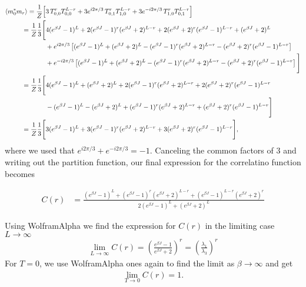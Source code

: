 \documentclass[reprint,english,notitlepage,aps,nobalancelastpage,nofootinbib]{revtex4-1}
\newcommand{\closed}[1]{\left(#1\right)}
\newcommand{\bracket}[1]{\left[#1\right]}
\newcommand{\ebj}{e^{\beta J}}
\renewcommand{\l}{\lambda}
\begin{document}
\begin{align*}
	\expval{m_0^* m_r} = \frac{1}{Z} \Big[ &3\, T_{0,0}^r T_{0,0}^{L-r} + 3e^{i2\pi/3}\, T_{0,1}^r T_{1,0}^{L-r} + 3e^{-i2\pi/3}\, T_{1,0}^r T_{0,1}^{L-r} \Big] \\ 
	= \frac{1}{Z} \frac{1}{3} \Bigg[ &4(\ebj-1)^L + 2(\ebj-1)^r (\ebj+2)^{L-r} + 2 (\ebj+2)^r (\ebj-1)^{L-r} + (\ebj+2)^L \\
	& + e^{i2\pi/3}\bracket{ (\ebj-1)^L + (\ebj+2)^L - (\ebj-1)^r (\ebj+2)^{L-r} - (\ebj+2)^r (\ebj-1)^{L-r} } \\
	& + e^{-i2\pi/3} \bracket{(\ebj-1)^L + (\ebj+2)^L - (\ebj-1)^r (\ebj+2)^{L-r} - (\ebj+2)^r (\ebj-1)^{L-r}} \Bigg] \\ 
	= \frac{1}{Z}\frac{1}{3} \Bigg[ & 4(\ebj-1)^L + (\ebj+2)^L + 2(\ebj-1)^r (\ebj+2)^{L-r} + 2 (\ebj+2)^r (\ebj-1)^{L-r} \\
	& - (\ebj-1)^L - (\ebj+2)^L + (\ebj-1)^r (\ebj+2)^{L-r} + (\ebj+2)^r (\ebj-1)^{L-r} \Bigg] \\ 
	= \frac{1}{Z} \frac{1}{3} \Bigg[ & 3(\ebj-1)^L + 3 (\ebj-1)^r (\ebj+2)^{L-r} + 3 (\ebj+2)^r (\ebj-1)^{L-r} \Bigg],
\end{align*}
where we used that $e^{i2\pi/3} + e^{-i2\pi/3}=-1$. Canceling the common factors of $3$ and writing out the partition function, our final expression for the correlatino function becomes 

\begin{align} \label{eq:corr_func_result}
	C(r) &= \frac{(\ebj-1)^L + (\ebj-1)^r (\ebj+2)^{L-r} + (\ebj-1)^{L-r} (\ebj+2)^r}{2(\ebj-1)^L + (\ebj+2)^L}
\end{align}

Using WolframAlpha we find the expression for $C(r)$ in the limiting case $L\to\infty$
\begin{align*}
	\lim_{L\to\infty} C(r) = \closed{\frac{\ebj-1}{\ebj+2}}^r = \closed{\frac{\l_1}{\l_3}}^r
\end{align*}
For $T=0$, we use WolframAlpha ones again to find the limit as $\beta\to\infty$ and get 
\begin{align*}
	\lim_{T\to0} C(r) = 1.
\end{align*}
\end{document}
